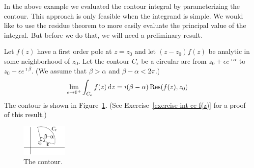In the above example we evaluated the contour integral by parameterizing
the contour.  This approach is only feasible when the integrand is
simple.  We would like to use the residue theorem to more easily
evaluate the principal value of the integral.  But before we do
that, we will need a preliminary result.





\begin{Result}
  \label{cpv_arcint}
  Let $f(z)$ have a first order pole at $z=z_0$ and let $(z-z_0)f(z)$ be 
  analytic in some neighborhood of $z_0$.  Let the contour $C_\epsilon$
  be a circular arc from $z_0 + \epsilon e^{\imath \alpha}$ to 
  $z_0 + \epsilon e^{\imath \beta}$.  (We assume that $\beta > \alpha$ and 
  $\beta - \alpha < 2\pi$.)
  \[
  \lim_{\epsilon \to 0^+} \int_{C_\epsilon} f(z) \,\mathrm{d} z =
  \imath (\beta - \alpha) \mathop{\mathrm{Res}}\nolimits( f(z), z_0 )
  \]
  The contour is shown in Figure~\ref{cpv_ceab}.
  (See Exercise~\ref{exercise int ce f(z)} for a proof of this result.)
\end{Result}



\begin{figure}[tb!]
  \begin{center}
    \includegraphics[width=0.2\textwidth]{fcv/residue/cpv_ceab}
  \end{center}
  \caption{The contour.}
  \label{cpv_ceab}
\end{figure}









